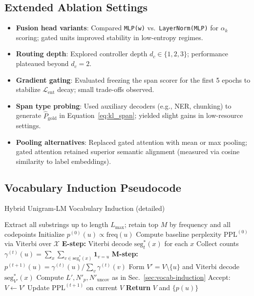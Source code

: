 \subsection{Extended Ablation Settings}
\label{sec:ablation-settings}

\begin{itemize}[leftmargin=1.5em]
	\item \textbf{Fusion head variants}: Compared \texttt{MLP(w)} vs.\ \texttt{LayerNorm(MLP)} for $\alpha_k$ scoring; gated units improved stability in low-entropy regimes.
	\item \textbf{Routing depth}: Explored controller depth $d_c \in \{1,2,3\}$; performance plateaued beyond $d_c=2$.
	\item \textbf{Gradient gating}: Evaluated freezing the span scorer for the first 5 epochs to stabilize $\mathcal{L}_{\mathrm{ent}}$ decay; small trade-offs observed.
	\item \textbf{Span type probing}: Used auxiliary decoders (e.g., NER, chunking) to generate $\hat{P}_{\mathrm{gold}}$ in Equation~\eqref{eq:kl_span}; yielded slight gains in low-resource settings.
	\item \textbf{Pooling alternatives}: Replaced gated attention with mean or max pooling; gated attention retained superior semantic alignment (measured via cosine similarity to label embeddings).
\end{itemize}

\subsection{Vocabulary Induction Pseudocode}
\label{sec:induction-pseudocode}

\begin{algorithm}[H]
	\caption{Hybrid Unigram‐LM Vocabulary Induction (detailed)}
	\label{alg:induction-detailed}
	\begin{algorithmic}[1]
		\STATE Extract all substrings up to length $L_{\max}$; retain top $M$ by frequency and all codepoints
		\STATE Initialize $p^{(0)}(u) \propto \mathrm{freq}(u)$
		\STATE Compute baseline perplexity $\mathrm{PPL}^{(0)}$ via Viterbi over $\mathcal X$
		\STATE \textbf{E-step:} Viterbi decode $\mathrm{seg}^*_t(x)$ for each $x$
		\STATE Collect counts $\gamma^{(t)}(u)\!=\!\sum_x\sum_{v\in\mathrm{seg}^*_t(x)}\mathbf1_{v=u}$
		\STATE \textbf{M-step:} $p^{(t+1)}(u)\!=\!\gamma^{(t)}(u)\big/\sum_v\gamma^{(t)}(v)$
		\STATE Form $V' = V\setminus\{u\}$ and Viterbi decode $\mathrm{seg}^*_{V'}(x)$
		\STATE Compute $L', N'_p, N'_{\mathrm{uncov}}$ as in Sec.~\ref{sec:vocab-induction}
		\STATE Accept: $V\leftarrow V'$
		\ENDIF
		\ENDFOR
		\STATE Update $\mathrm{PPL}^{(t+1)}$ on current $V$
		\ENDFOR
		\STATE \textbf{Return} $V$ and $\{p(u)\}$
	\end{algorithmic}
\end{algorithm}

